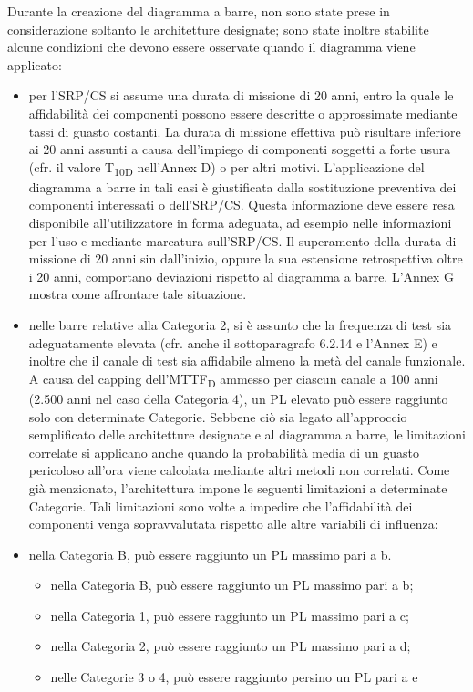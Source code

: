 Durante la creazione del diagramma a barre, non sono state prese in considerazione soltanto le architetture designate; sono state inoltre stabilite alcune condizioni che devono essere osservate quando il diagramma viene applicato:
\begin{itemize}
    	\item per l'SRP/CS si assume una durata di missione di 20 anni, entro la quale le affidabilità dei componenti possono essere descritte o approssimate mediante tassi di guasto costanti. La durata di missione effettiva può risultare inferiore ai 20 anni assunti a causa dell'impiego di componenti soggetti a forte usura (cfr. il valore T\textsubscript{10D} nell'Annex D) o per altri motivi. L'applicazione del diagramma a barre in tali casi è giustificata dalla sostituzione preventiva dei componenti interessati o dell'SRP/CS\@. Questa informazione deve essere resa disponibile all'utilizzatore in forma adeguata, ad esempio nelle informazioni per l'uso e mediante marcatura sull'SRP/CS\@. Il superamento della durata di missione di 20 anni sin dall'inizio, oppure la sua estensione retrospettiva oltre i 20 anni, comportano deviazioni rispetto al diagramma a barre. L'Annex G mostra come affrontare tale situazione.
    	\item nelle barre relative alla Categoria 2, si è assunto che la frequenza di test sia adeguatamente elevata (cfr. anche il sottoparagrafo 6.2.14 e l'Annex E) e inoltre che il canale di test sia affidabile almeno la metà del canale funzionale. A causa del capping dell'MTTF\textsubscript{D} ammesso per ciascun canale a 100 anni (2.500 anni nel caso della Categoria 4), un PL elevato può essere raggiunto solo con determinate Categorie. Sebbene ciò sia legato all'approccio semplificato delle architetture designate e al diagramma a barre, le limitazioni correlate si applicano anche quando la probabilità media di un guasto pericoloso all'ora viene calcolata mediante altri metodi non correlati. Come già menzionato, l'architettura impone le seguenti limitazioni a determinate Categorie. Tali limitazioni sono volte a impedire che l'affidabilità dei componenti venga sopravvalutata rispetto alle altre variabili di influenza:
    	\item nella Categoria B, può essere raggiunto un PL massimo pari a b.
    	\begin{itemize}
            \item nella Categoria B, può essere raggiunto un PL massimo pari a b;
            \item nella Categoria 1, può essere raggiunto un PL massimo pari a c;
            \item nella Categoria 2, può essere raggiunto un PL massimo pari a d;
            \item nelle Categorie 3 o 4, può essere raggiunto persino un PL pari a e
        \end{itemize}
\end{itemize}

